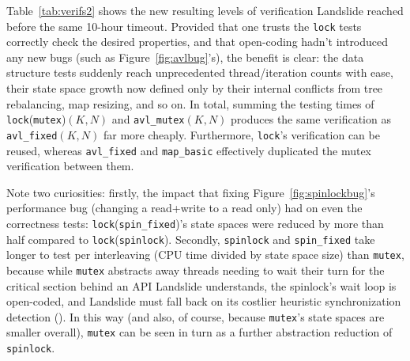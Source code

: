 Table~\ref{tab:verifs2} shows the new resulting levels of verification
Landslide reached before the same 10-hour timeout.
Provided that one trusts the {\tt lock} tests correctly check the desired properties,
and that open-coding hadn't introduced any new bugs (such as Figure~\ref{fig:avlbug}'s),
the benefit is clear:
the data structure tests suddenly reach unprecedented thread/iteration counts with ease,
their state space growth now defined only by their internal conflicts from tree rebalancing, map resizing, and so on.
In total,
summing the testing times of {\tt lock}({\tt mutex})$(K,N)$ and {\tt avl\_mutex}$(K,N)$
produces the same verification as {\tt avl\_fixed}$(K,N)$ far more cheaply.
Furthermore, {\tt lock}'s verification can be reused,
whereas {\tt avl\_fixed} and {\tt map\_basic} effectively duplicated the mutex verification between them.

Note two curiosities:
firstly,
the impact that fixing Figure~\ref{fig:spinlockbug}'s performance bug
(changing a read+write to a read only)
had on even the correctness tests:
{\tt lock}({\tt spin\_fixed})'s state spaces were reduced by more than half compared to {\tt lock}({\tt spinlock}).
Secondly, {\tt spinlock} and {\tt spin\_fixed} take longer to test per interleaving
(CPU time divided by state space size)
than {\tt mutex},
because while {\tt mutex} abstracts away threads needing to wait their turn for the critical section
behind an API Landslide understands,
the spinlock's wait loop is open-coded, and Landslide must fall back on its costlier heuristic synchronization detection
(\sect{\ref{sec:landslide-blocking}}).
In this way (and also, of course, because {\tt mutex}'s state spaces are smaller overall),
{\tt mutex} can be seen in turn as a further abstraction reduction of {\tt spinlock}.

